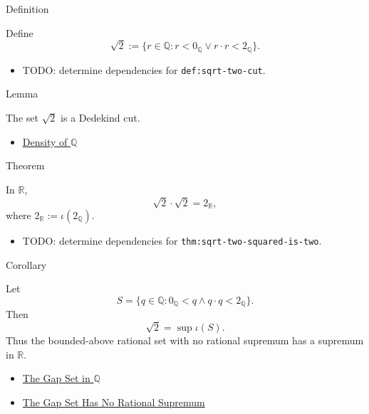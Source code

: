 \begin{definitionbox}{Definition}
\begin{definition}
\label{def:sqrt-two-cut}
Define
\[
\sqrt{2}:=\{r\in\mathbb{Q}:r<0_{\mathbb{Q}}\lor r\cdot r<2_{\mathbb{Q}}\}.
\]
\end{definition}
\end{definitionbox}

\begin{dependencies}
\begin{itemize}
  \item TODO: determine dependencies for \texttt{def:sqrt-two-cut}.
\end{itemize}
\end{dependencies}

\begin{lemmabox}{Lemma}
\begin{lemma}
\label{lem:sqrt-two-is-a-cut}
The set $\sqrt{2}$ is a Dedekind cut.
\end{lemma}
\end{lemmabox}

\begin{dependencies}
\begin{itemize}
  \item \hyperref[thm:density-of-q]{Density of $\mathbb{Q}$}
\end{itemize}
\end{dependencies}

\begin{theorembox}{Theorem}
\begin{theorem}
\label{thm:sqrt-two-squared-is-two}
In $\mathbb{R}$,
\[
\sqrt{2}\cdot\sqrt{2}=2_{\mathbb{R}},
\]
where $2_{\mathbb{R}}:=\iota(2_{\mathbb{Q}})$.
\end{theorem}
\end{theorembox}

\begin{dependencies}
\begin{itemize}
  \item TODO: determine dependencies for \texttt{thm:sqrt-two-squared-is-two}.
\end{itemize}
\end{dependencies}

\begin{corollarybox}{Corollary}
\begin{corollary}
\label{cor:r-fills-the-gap}
Let
\[
S=\{q\in\mathbb{Q}:0_{\mathbb{Q}}<q\land q\cdot q<2_{\mathbb{Q}}\}.
\]
Then
\[
\sqrt{2}=\sup \iota(S).
\]
Thus the bounded-above rational set with no rational supremum has a supremum
in $\mathbb{R}$.
\end{corollary}
\end{corollarybox}

\begin{dependencies}
\begin{itemize}
  \item \hyperref[def:gap-set-q]{The Gap Set in $\mathbb{Q}$}
  \item \hyperref[thm:gap-set-no-rational-supremum-q]{The Gap Set Has No Rational Supremum}
\end{itemize}
\end{dependencies}
